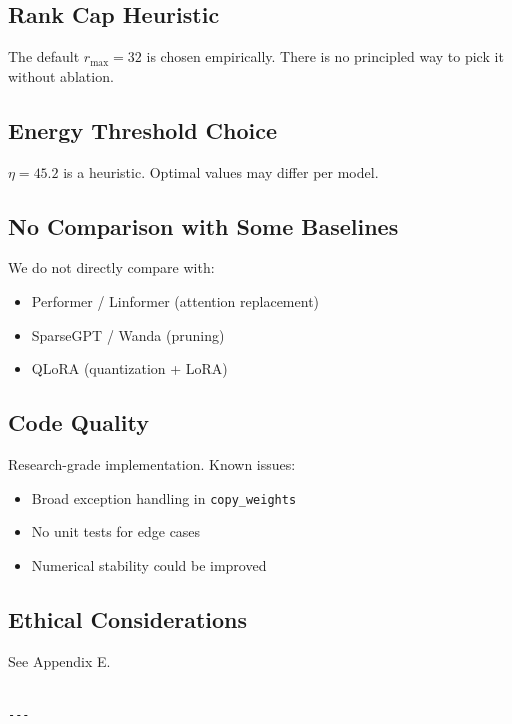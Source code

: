 \subsection{Rank Cap Heuristic}

The default $r_\text{max} = 32$ is chosen empirically. There is no 
principled way to pick it without ablation.

\subsection{Energy Threshold Choice}

$\eta = 45.2$ is a heuristic. Optimal values may differ per model.

\subsection{No Comparison with Some Baselines}

We do not directly compare with:
\begin{itemize}
\item Performer / Linformer (attention replacement)
\item SparseGPT / Wanda (pruning)
\item QLoRA (quantization + LoRA)

\end{itemize}
\subsection{Code Quality}

Research-grade implementation. Known issues:
\begin{itemize}
\item Broad exception handling in \texttt{copy\_weights}
\item No unit tests for edge cases
\item Numerical stability could be improved

\end{itemize}
\subsection{Ethical Considerations}

See Appendix E.
\begin{lstlisting}

---
\end{lstlisting}